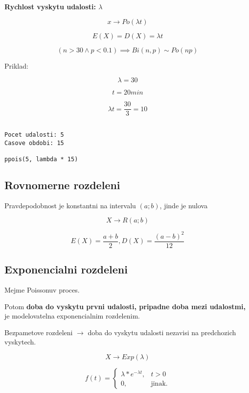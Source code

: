 \documentclass{article}
\begin{document}
\textbf{Rychlost vyskytu udalosti: $\lambda$}

\[ x \rightarrow Po(\lambda t) \]

\[ E(X) = D(X) = \lambda t \]

\[ (n > 30 \land p < 0.1) \implies Bi(n,p) \sim Po(np) \]

Priklad:



\[ \lambda = 30 \]

\[ t = 20 min \]

\[ \lambda t = \frac{30}{3} = 10 \]

\begin{verbatim}

Pocet udalosti: 5
Casove obdobi: 15

ppois(5, lambda * 15)

\end{verbatim}

\subsection{Rovnomerne rozdeleni}

Pravdepodobnost je konstantni na intervalu $(a;b)$, jinde je nulova

\[ X \rightarrow R(a;b) \]

\[ E(X) = \frac{a+b}{2}, D(X) = \frac{(a-b)^2}{12} \]


\subsection{Exponencialni rozdeleni}

Mejme Poissonuv proces.

Potom \textbf{doba do vyskytu prvni udalosti, pripadne doba mezi udalostmi,} je modelovatelna exponencialnim
rozdelenim.

Bezpametove rozdeleni $\rightarrow$ doba do vyskytu udalosti nezavisi na predchozich vyskytech.

\[ X \rightarrow Exp(\lambda) \]


\begin{equation}
    f(t)=\begin{cases}
        \lambda * e^{-\lambda t}, & t > 0\\
        0, & \text{jinak}.
  \end{cases}
\end{equation}
\end{document}
